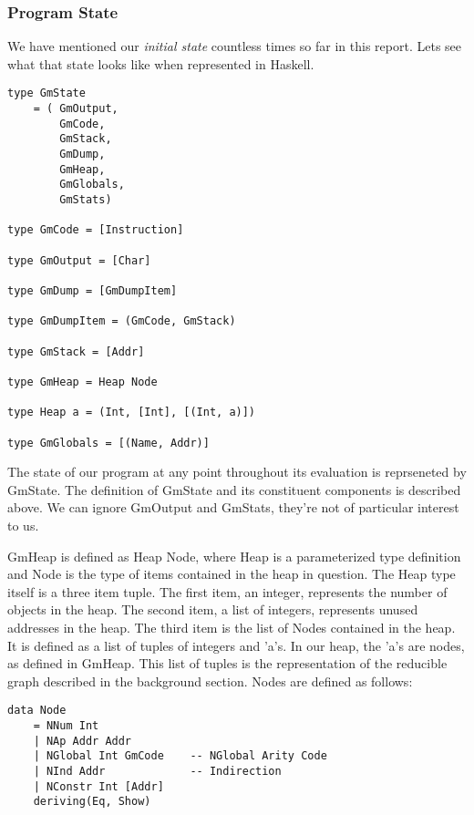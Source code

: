 \subsubsection{Program State}
We have mentioned our \emph{initial state} countless times
so far in this report. Lets see what that state looks like
when represented in Haskell.

\begin{verbatim}
type GmState 
	= (	GmOutput,
		GmCode,
		GmStack,
		GmDump,
		GmHeap,
		GmGlobals,
		GmStats)

type GmCode = [Instruction]

type GmOutput = [Char]

type GmDump = [GmDumpItem]

type GmDumpItem = (GmCode, GmStack)		

type GmStack = [Addr]

type GmHeap = Heap Node

type Heap a = (Int, [Int], [(Int, a)])

type GmGlobals = [(Name, Addr)]

\end{verbatim}

The state of our program at any point throughout its evaluation
is reprseneted by GmState. The definition of GmState and its
constituent components is described above. We can ignore GmOutput
and GmStats, they're not of particular interest to us. 

GmHeap is defined as Heap Node, where Heap is a parameterized type
definition and Node is the type of items contained in the heap in 
question. The Heap type itself is a three item tuple. The first item, 
an integer, represents the number of objects in the heap. The second
item, a list of integers, represents unused addresses in the heap. 
The third item is the list of Nodes contained in the heap. It is 
defined as a list of tuples of integers and 'a's. In our heap, the
'a's are nodes, as defined in GmHeap. This list of tuples is the
representation of the reducible graph described in the background
section. Nodes are defined as follows:

\begin{verbatim}
data Node 
	= NNum Int 
	| NAp Addr Addr  		
	| NGlobal Int GmCode 	-- NGlobal Arity Code
	| NInd Addr 			-- Indirection
	| NConstr Int [Addr]
	deriving(Eq, Show)
\end{verbatim}

